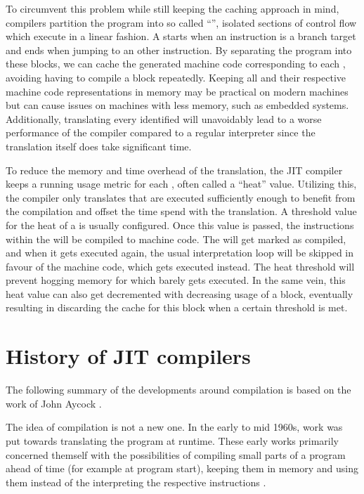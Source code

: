To circumvent this problem while still keeping the caching approach in mind, \jit{} compilers partition the program into so called \enquote{\bbs{}}, isolated sections of control flow which execute in a linear fashion. 
A \bb{} starts when an instruction is a branch target and ends when jumping to an other instruction. 
By separating the program into these blocks, we can cache the generated machine code corresponding to each \bb{}, avoiding having to compile a block repeatedly. 
Keeping all \bbs{} and their respective machine code representations in memory may be practical on modern machines but can cause issues on machines with less memory, such as embedded systems.
Additionally, translating every identified \bb{} will unavoidably lead to a worse performance of the \jit{} compiler compared to a regular interpreter since the translation itself does take significant time. 

To reduce the memory and time overhead of the translation, the JIT compiler keeps a running usage metric for each \bb{}, often called a \enquote{heat} value. 
Utilizing this, the compiler only translates \bbs{} that are executed sufficiently enough to benefit from the compilation and offset the time spend with the translation. 
A threshold value for the heat of a \bb{} is usually configured. 
Once this value is passed, the instructions within the \bb{} will be compiled to machine code.
The \bb{} will get marked as compiled, and when it gets executed again, the usual interpretation loop will be skipped in favour of the machine code, which gets executed instead. 
The heat threshold will prevent hogging memory for \bbs{} which barely gets executed. In the same vein, this heat value can also get decremented with decreasing usage of a block, eventually resulting in discarding the cache for this block when a certain threshold is met. 

\section{History of JIT compilers}
The following summary of the developments around \jit{} compilation is based on the work of John Aycock \cite{aycock2003}.

The idea of \jit{} compilation is not a new one.
In the early to mid 1960s, work was put towards translating the program at runtime. These early works primarily concerned themself with the possibilities of compiling small parts of a program ahead of time (for example at program start), keeping them in memory and using them instead of the interpreting the respective instructions \cites{mccarthy1960, uom1964}.

